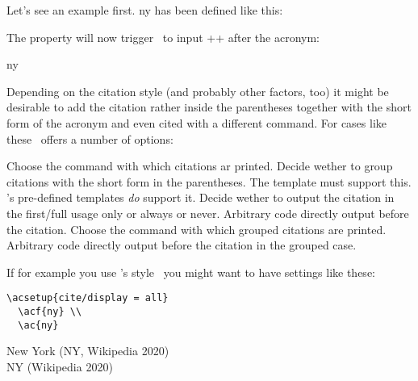\documentclass{acro-manual}
\begin{document}
Let's see an example first. \acs*{ny} has been defined like this:
\begin{sourcecode}
\end{sourcecode}
The property  will now trigger \acro\ to input
\verbcode+\cite{NewYork}+ after the acronym:
\begin{example}
  \ac{ny}
\end{example}
Depending on the citation style (and probably other factors, too) it might be
desirable to add the citation rather inside the parentheses together with the
short form of the acronym and even cited with a different command.  For cases
like these \acro\ offers a number of options:
\begin{options}
    Choose the command with which citations ar printed.
    Decide wether to group citations with the short form in the parentheses.
    The template must support this.  \acro's pre-defined templates \emph{do}
    support it.
    Decide wether to output the citation in the first/full usage only or
    always or never.
    Arbitrary code directly output before the citation.
    Choose the command with which grouped citations are printed.
  \Default{,\textvisiblespace}
    Arbitrary code directly output before the citation in the grouped case.
\end{options}

If for example you use 's 
style~\cite{pkg:biblatex} you might want to have settings like these:
\begin{sourcecode}
\end{sourcecode}
\begin{cnltxcode}
\begin{lstlisting}[style=cnltx]
  \acsetup{cite/display = all}
  \acf{ny} \\
  \ac{ny}
\end{lstlisting}
\tcblower
  New York (NY, Wikipedia 2020) \\
  NY (Wikipedia 2020)
\end{cnltxcode}
\end{document}
